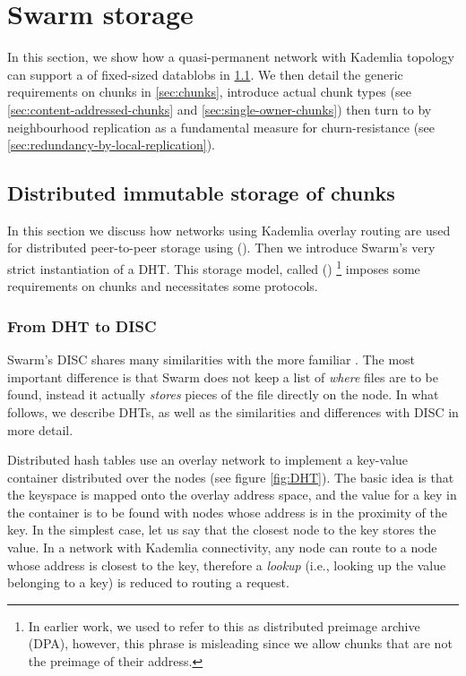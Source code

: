 \section{Swarm storage}\label{sec:kademlia-storage}
\green{}
In this section, we show how a quasi-permanent network with Kademlia topology can support a   of fixed-sized datablobs in \ref{sec:disc}. We then detail the generic requirements on chunks in \ref{sec:chunks}, introduce actual chunk types (see \ref{sec:content-addressed-chunks} and \ref{sec:single-owner-chunks}) then turn to  by neighbourhood replication as a fundamental measure for churn-resistance (see \ref{sec:redundancy-by-local-replication}).

\subsection{Distributed immutable storage of chunks}\label{sec:disc}
 
In this section we discuss how  networks using Kademlia overlay routing are used for distributed peer-to-peer storage using  (). Then we introduce Swarm's very strict instantiation of a DHT. This storage model, called  ()%
%
\footnote{In earlier work, we used to refer to this as distributed preimage archive (DPA), however, this phrase is misleading since we allow chunks that are not the preimage of their address.}
imposes some requirements on chunks and necessitates some  protocols.
 
\subsubsection{From DHT to DISC}
Swarm's DISC shares many similarities with the more familiar . The most important difference is that Swarm does not keep a list of \emph{where} files are to be found, instead it actually \emph{stores} pieces of the file directly on the node. 
In what follows, we describe DHTs, as well as the similarities and differences with DISC in more detail. 
 
Distributed hash tables use an overlay network to implement a key-value container distributed over the nodes (see figure \ref{fig:DHT}). The basic idea is that the keyspace is mapped onto the overlay address space, and the value for a key in the container is to be found with nodes whose address is in the proximity of the key. In the simplest case, let us say that the closest node to the key stores the value. In a network with Kademlia connectivity, any node can route to a node whose address is closest to the key, therefore a \emph{lookup} (i.e., looking up the value belonging to a key) is reduced to routing a request. 

